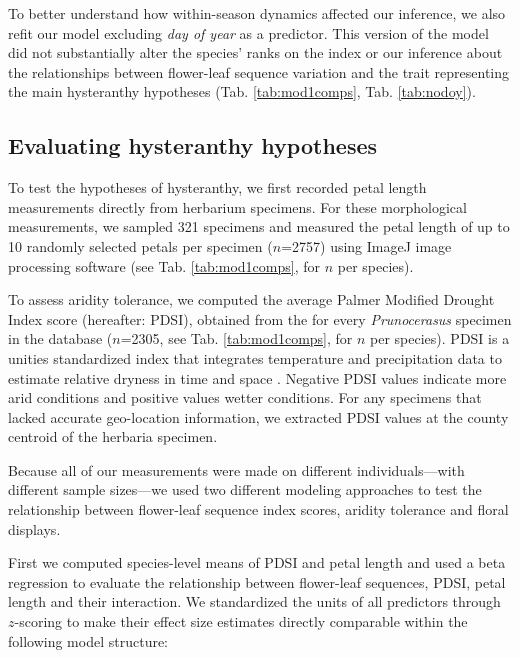 \documentclass{article}[12pt]
\begin{document}
To better understand how within-season dynamics affected our inference, we also refit our model excluding \emph{day of year} as a predictor. This version of the model did not substantially alter the species' ranks on the index or our inference about the relationships between flower-leaf sequence variation and the trait representing the main hysteranthy hypotheses (Tab. \ref{tab:mod1comps}, Tab. \ref{tab:nodoy}). 

\subsection*{Evaluating hysteranthy hypotheses}
To test the hypotheses of hysteranthy, we first recorded petal length measurements directly from herbarium specimens. For these morphological measurements, we sampled 321 specimens and measured the petal length of up to 10 randomly selected petals per specimen ($n$=2757) using ImageJ image processing software (see Tab. \ref{tab:mod1comps}, for $n$ per species).%

To assess aridity tolerance, we computed the average Palmer Modified Drought Index score (hereafter: PDSI), obtained from the \citet{NOAA} for every \textit{Prunocerasus} specimen in the database ($n$=2305, see Tab. \ref{tab:mod1comps}, for $n$ per species). PDSI is a unities standardized index that integrates temperature and precipitation data to estimate relative dryness in time and space \citep{Heim:2002uw}. Negative PDSI values indicate more arid conditions and positive values wetter conditions. %
For any specimens that lacked accurate geo-location information, we extracted PDSI values at the county centroid of the herbaria specimen. 

Because all of our measurements were made on different individuals---with different sample sizes---we used two different modeling approaches to test the relationship between flower-leaf sequence index scores, aridity tolerance and floral displays.

First we computed species-level means of PDSI and petal length and used a beta regression to evaluate the relationship between flower-leaf sequences, PDSI, petal length and their interaction. We standardized the units of all predictors through $z$-scoring \citep{Gelman2007} to make their effect size estimates directly comparable within the following model structure:\\
\end{document}
